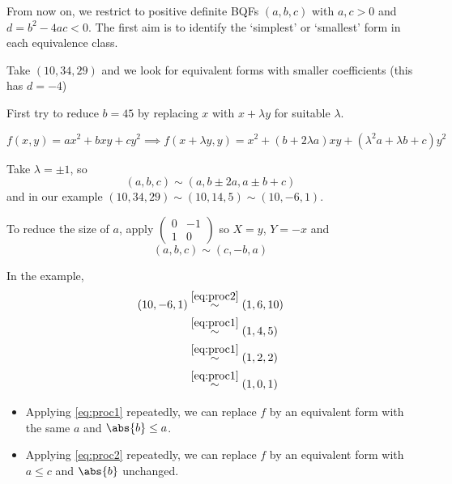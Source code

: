 \documentclass{article}
\begin{document}
From now on, we restrict to positive definite BQFs $(a, b, c)$ with $a,c>0$ and $d = b^2 - 4 ac < 0$.
The first aim is to identify the `simplest' or `smallest' form in each equivalence class.
\begin{eg}
    Take $(10, 34, 29)$ and we look for equivalent forms with smaller coefficients (this has $d=-4$)

    First try to reduce $b=45$ by replacing $x$ with $x + \lambda y$ for suitable $\lambda$.

    \begin{equation*}
        f(x, y) = a x^2 + b x y + c y^2 \implies f(x + \lambda y, y) = x^2 + (b + 2 \lambda a) x y + (\lambda^2 a + \lambda b + c) y^2
    \end{equation*}

    Take $\lambda = \pm 1$, so
    \begin{equation*}
        (a, b, c) \sim (a, b \pm 2a, a \pm b + c) \tag{$*$} \label{eq:proc1}
    \end{equation*}
    and in our example $(10, 34, 29) \sim (10, 14, 5) \sim (10, -6, 1)$.

    To reduce the size of $a$, apply $\begin{pmatrix}0 & -1 \\ 1 & 0\end{pmatrix}$ so $X = y$, $Y = -x$ and
    \begin{equation*}
        (a, b, c) \sim (c, -b, a) \tag{$**$} \label{eq:proc2}
    \end{equation*}

    In the example,
    \begin{align*}
        (10, -6, 1) &\overset{\eqref{eq:proc2}}{\sim} (1, 6, 10) \\
                    &\overset{\eqref{eq:proc1}}{\sim} (1, 4, 5) \\
                    &\overset{\eqref{eq:proc1}}{\sim} (1, 2, 2) \\
                    &\overset{\eqref{eq:proc1}}{\sim} (1, 0, 1)
    \end{align*}
\end{eg}

\begin{remark}
    \begin{itemize}
        \item Applying \eqref{eq:proc1} repeatedly, we can replace $f$ by an equivalent form with the same $a$ and $\abs{b} \leq a$.
        \item Applying \eqref{eq:proc2} repeatedly, we can replace $f$ by an equivalent form with $a \leq c$ and $\abs{b}$ unchanged.
    \end{itemize}
\end{remark}
\end{document}
